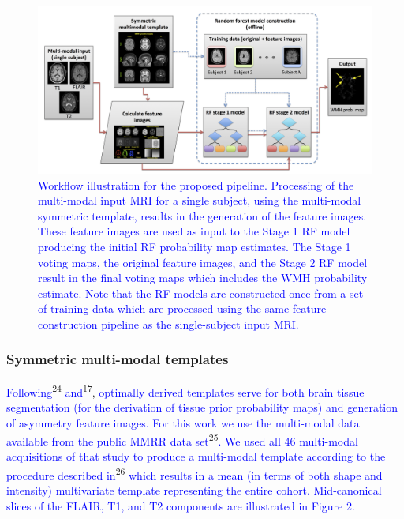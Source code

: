 \documentclass[11pt,]{article}
\begin{document}
\begin{figure}[htbp]
\centering
\includegraphics{Figures/wmhPipeline.png}
\caption{\textcolor{blue}{Workflow illustration for the proposed pipeline.  Processing of the multi-modal
input MRI for a single subject, using the multi-modal symmetric template, results in
the generation of the feature images.  These feature images are used as input to the
Stage 1 RF model producing the initial RF probability map estimates.  The Stage 1
voting maps, the original feature images, and the Stage 2 RF model result in the
final voting maps which includes the WMH probability estimate.  Note that the RF models
are constructed once from a set of training data which are processed using the
same feature-construction pipeline as the single-subject input MRI.}}
\end{figure}

\subsubsection{Symmetric multi-modal
templates}\label{symmetric-multi-modal-templates}

\textcolor{blue}{Following}\textsuperscript{24}
\textcolor{blue}{and}\textsuperscript{17},
\textcolor{blue}{optimally derived templates
serve for both brain tissue segmentation (for the derivation of tissue prior probability maps) and generation of asymmetry feature images.
For this work we use the multi-modal data available from the public MMRR data set}\textsuperscript{25}\textcolor{blue}{.  We used all 46 multi-modal acquisitions of that study to produce a multi-modal template according to the procedure described in}\textsuperscript{26}
\textcolor{blue}{which
results in a mean (in terms of both shape and intensity) multivariate template representing the entire cohort.  Mid-canonical slices of the FLAIR, T1, and T2 components are illustrated in Figure 2.}
\end{document}
